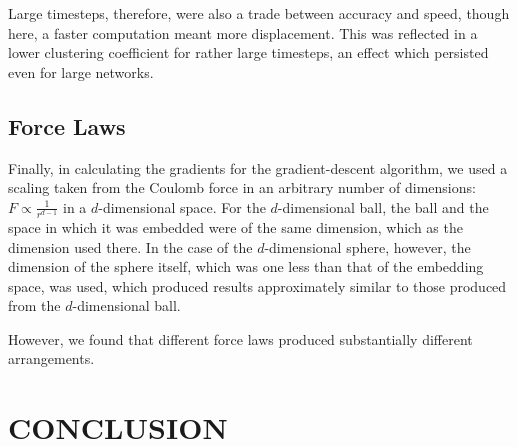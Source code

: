 \documentclass[aps,pre,reprint,superscriptaddress,amsmath,amssymb,nofootinbib]{revtex4-1}
\begin{document}
Large timesteps, therefore, were also a trade between accuracy and speed, though here, a faster computation meant more displacement.  
This was reflected in a lower clustering coefficient for rather large timesteps, an effect which persisted even for large networks.

\subsection{Force Laws}
Finally, in calculating the gradients for the gradient-descent algorithm, we used a scaling taken from the Coulomb force in an arbitrary number of dimensions: $F \propto \frac{1}{r^{d-1}}$ in a $d$-dimensional space.  
For the $d$-dimensional ball, the ball and the space in which it was embedded were of the same dimension, which as the dimension used there.  
In the case of the $d$-dimensional sphere, however, the dimension of the sphere itself, which was one less than that of the embedding space, was used, which produced results approximately similar to those produced from the $d$-dimensional ball.

However, we found that different force laws produced substantially different arrangements.  %

\section{CONCLUSION}


\end{document}

